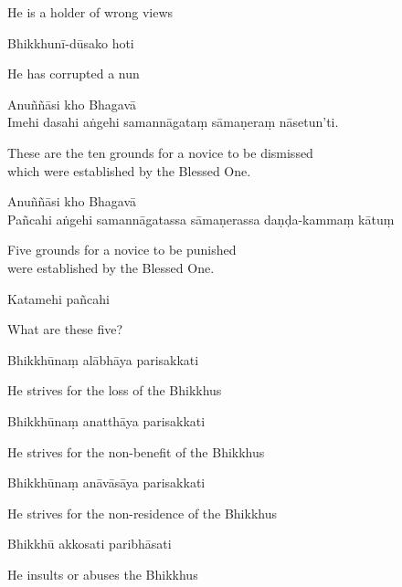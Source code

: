 \begin{cprenglish}
  He is a holder of wrong views
\end{cprenglish}

Bhikkhunī-dūsako hoti

\begin{cprenglish}
  He has corrupted a nun
\end{cprenglish}

Anuññāsi kho Bhagavā\\
Imehi dasahi aṅgehi samannāgataṃ sāmaṇeraṃ nāsetun'ti.

\begin{cprenglish}
  These are the ten grounds for a novice to be dismissed\\
  which were established by the Blessed One. 
\end{cprenglish}

Anuññāsi kho Bhagavā\\
Pañcahi aṅgehi samannāgatassa sāmaṇerassa daṇḍa-kammaṃ kātuṃ

\begin{cprenglish}
  Five grounds for a novice to be punished\\
  were established by the Blessed One.
\end{cprenglish}

Katamehi pañcahi

\begin{cprenglish}
  What are these five?
\end{cprenglish}

Bhikkhūnaṃ alābhāya parisakkati

\begin{cprenglish}
  He strives for the loss of the Bhikkhus
\end{cprenglish}

Bhikkhūnaṃ anatthāya parisakkati

\begin{cprenglish}
  He strives for the non-benefit of the Bhikkhus
\end{cprenglish}

Bhikkhūnaṃ anāvāsāya parisakkati

\begin{cprenglish}
  He strives for the non-residence of the Bhikkhus
\end{cprenglish}

Bhikkhū akkosati paribhāsati

\begin{cprenglish}
  He insults or abuses the Bhikkhus
\end{cprenglish}

